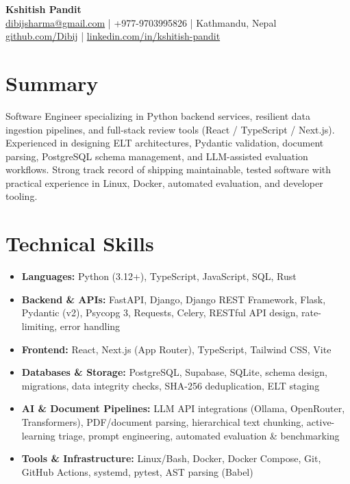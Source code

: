 \documentclass[a4paper,10pt]{article}
\begin{document}
\begin{center}
    {\LARGE \textbf{Kshitish Pandit}} \\[4pt]
    \href{mailto:dibijsharma@gmail.com}{dibijsharma@gmail.com} \quad | \quad +977-9703995826 \quad | \quad Kathmandu, Nepal \\[2pt]
    \href{https://github.com/Dibij}{github.com/Dibij} \quad | \quad
    \href{https://www.linkedin.com/in/kshitish-pandit}{linkedin.com/in/kshitish-pandit}
\end{center}

\vspace{2pt}

\section*{Summary}
Software Engineer specializing in Python backend services, resilient data ingestion pipelines, and full-stack review tools (React / TypeScript / Next.js). Experienced in designing ELT architectures, Pydantic validation, document parsing, PostgreSQL schema management, and LLM-assisted evaluation workflows. Strong track record of shipping maintainable, tested software with practical experience in Linux, Docker, automated evaluation, and developer tooling.

\section*{Technical Skills}
\begin{itemize}
    \item \textbf{Languages:} Python (3.12+), TypeScript, JavaScript, SQL, Rust
    \item \textbf{Backend \& APIs:} FastAPI, Django, Django REST Framework, Flask, Pydantic (v2), Psycopg 3, Requests, Celery, RESTful API design, rate-limiting, error handling
    \item \textbf{Frontend:} React, Next.js (App Router), TypeScript, Tailwind CSS, Vite
    \item \textbf{Databases \& Storage:} PostgreSQL, Supabase, SQLite, schema design, migrations, data integrity checks, SHA-256 deduplication, ELT staging
    \item \textbf{AI \& Document Pipelines:} LLM API integrations (Ollama, OpenRouter, Transformers), PDF/document parsing, hierarchical text chunking, active-learning triage, prompt engineering, automated evaluation \& benchmarking
    \item \textbf{Tools \& Infrastructure:} Linux/Bash, Docker, Docker Compose, Git, GitHub Actions, systemd, pytest, AST parsing (Babel)
\end{itemize}
\end{document}
